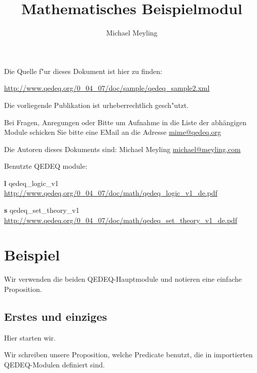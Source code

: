 \documentclass[a4paper,german,10pt,twoside]{book}
\title{Mathematisches Beispielmodul}
\author{
Michael Meyling
}
\theoremstyle{definition}
\theoremstyle{remark}
\begin{document}
\maketitle

\setlength{\parskip}{5pt plus 2pt minus 1pt}
\mbox{}
\vfill

\par
Die Quelle f{"ur} dieses Dokument ist hier zu finden:
\par
\url{http://www.qedeq.org/0_04_07/doc/sample/qedeq_sample2.xml}

\par
Die vorliegende Publikation ist urheberrechtlich gesch{"u}tzt.
\par
Bei Fragen, Anregungen oder Bitte um Aufnahme in die Liste der abh{\"a}ngigen Module schicken Sie bitte eine EMail an die Adresse \href{mailto:mime@qedeq.org}{mime@qedeq.org}

\par
Die Autoren dieses Dokuments sind:
Michael Meyling \href{mailto:michael@meyling.com}{michael@meyling.com}



\par
Benutzte QEDEQ module:

\par


\par
\textbf{l} qedeq\_logic\_v1 \url{http://www.qedeq.org/0_04_07/doc/math/qedeq_logic_v1_de.pdf}

\par
\textbf{s} qedeq\_set\_theory\_v1 \url{http://www.qedeq.org/0_04_07/doc/math/qedeq_set_theory_v1_de.pdf}


\setlength{\parskip}{0pt}
\tableofcontents

\setlength{\parskip}{5pt plus 2pt minus 1pt}

\chapter{Beispiel} \label{chapter1} \hypertarget{chapter1}{}

Wir verwenden die beiden QEDEQ-Hauptmodule und notieren eine einfache Proposition.

\section{Erstes und einziges} \label{chapter1_section1} \hypertarget{chapter1_section1}{}
Hier starten wir.

\par
Wir schreiben unsere Proposition, welche Predicate benutzt, die in importierten QEDEQ-Modulen definiert sind.
\end{document}
